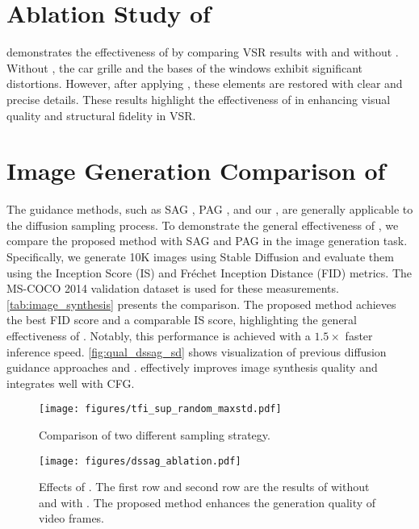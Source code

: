 \section{Ablation Study of {\drgabb}}
 demonstrates the effectiveness of {\drgabb} by comparing VSR results with and without {\drgabb}. Without {\drgabb}, the car grille and the bases of the windows exhibit significant distortions. However, after applying {\drgabb}, these elements are restored with clear and precise details. These results highlight the effectiveness of {\drgabb} in enhancing visual quality and structural fidelity in VSR.

\section{Image Generation Comparison of {\drgabb}}
The guidance methods, such as SAG \cite{sag}, PAG \cite{pag}, and our {\drgabb}, are generally applicable to the diffusion sampling process. To demonstrate the general effectiveness of {\drgabb}, we compare the proposed method with SAG and PAG in the image generation task. Specifically, we generate 10K images using Stable Diffusion \cite{sd} and evaluate them using the Inception Score (IS) \cite{is} and Fr\'echet Inception Distance (FID) \cite{fid} metrics. The MS-COCO 2014 validation dataset \cite{coco} is used for these measurements. \cref{tab:image_synthesis} presents the comparison. The proposed method achieves the best FID score and a comparable IS score, highlighting the general effectiveness of {\drgabb}. Notably, this performance is achieved with a $1.5\times$ faster inference speed. \cref{fig:qual_dssag_sd} shows visualization of previous diffusion guidance approaches and {\drgabb}. {\drgabb} effectively improves image synthesis quality and integrates well with CFG.

\begin{figure}[t]
    \centering
    \texttt{[image: figures/tfi\_sup\_random\_maxstd.pdf]}
    \caption{Comparison of two different {\tfiabb} sampling strategy.}
    \label{fig:tfi_sampling}
\end{figure}

\begin{figure}[t]
    \centering
    \texttt{[image: figures/dssag\_ablation.pdf]}
    \caption{Effects of {\drgabb}. The first row and second row 
     are the results of {\ours} without and with {\drgabb}. The proposed method enhances the generation quality of video frames.}
    \label{fig:ablation_drg}
\end{figure}

